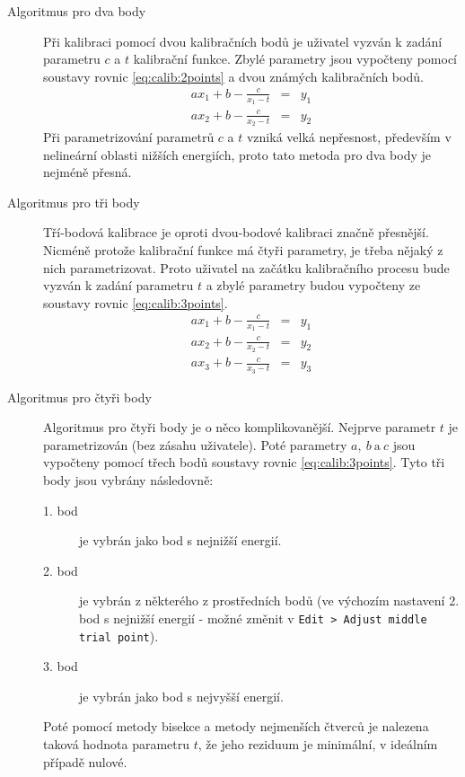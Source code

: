 \begin{description}
	\item[Algoritmus pro dva body]
	Při kalibraci pomocí dvou kalibračních bodů je uživatel vyzván k zadání parametru $c$ a $t$ kalibrační funkce. Zbylé parametry jsou vypočteny pomocí soustavy rovnic \ref{eq:calib:2points} a dvou známých kalibračních bodů.
	\begin{eqnarray}\label{eq:calib:2points}
		ax_{1} + b - \frac{c}{x_{1}-t} &=& y_{1} \\
		ax_{2} + b - \frac{c}{x_{2}-t} &=& y_{2} \nonumber 
	\end{eqnarray}
	Při parametrizování parametrů $c$ a $t$ vzniká velká nepřesnost, především v nelineární oblasti nižších energiích, proto tato metoda pro dva body je nejméně přesná.

	\item[Algoritmus pro tři body]
	Tří-bodová kalibrace je oproti dvou-bodové kalibraci značně přesnější. Nicméně protože kalibrační funkce má čtyři parametry, je třeba nějaký z nich parametrizovat. Proto uživatel na začátku kalibračního procesu bude vyzván k zadání parametru $t$ a zbylé parametry budou vypočteny ze soustavy rovnic \ref{eq:calib:3points}.
	\begin{eqnarray}\label{eq:calib:3points}
		ax_{1} + b - \frac{c}{x_{1}-t} &=& y_{1} \nonumber \\
		ax_{2} + b - \frac{c}{x_{2}-t} &=& y_{2} \\
		ax_{3} + b - \frac{c}{x_{3}-t} &=& y_{3}\nonumber 
	\end{eqnarray}

	\item[Algoritmus pro čtyři body]
	Algoritmus pro čtyři body je o něco komplikovanější. Nejprve parametr $t$ je parametrizován (bez zásahu uživatele). Poté parametry $a,~b~\text{a}~c$ jsou vypočteny pomocí třech bodů soustavy rovnic \ref{eq:calib:3points}. Tyto tři body jsou vybrány následovně:
	\begin{description}
		\item[1. bod] je vybrán jako bod s nejnižší energií.
		\item[2. bod] je vybrán z některého z prostředních bodů (ve výchozím nastavení 2. bod s nejnižší energií - možné změnit v \texttt{Edit > Adjust middle trial point}).
		\item[3. bod] je vybrán jako bod s nejvyšší energií.
	\end{description}

	Poté pomocí metody bisekce a metody nejmenších čtverců je nalezena taková hodnota parametru $t$, že jeho reziduum je minimální, v ideálním případě nulové.


\end{description}
